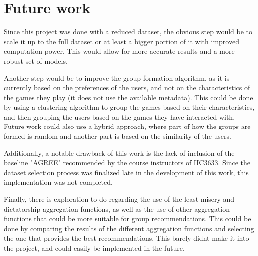\documentclass{article}
\begin{document}





\section{Future work}

Since this project was done with a reduced dataset, the obvious step would be to scale it up to the full dataset or at least a bigger portion of it with improved computation power. This would allow for more accurate results and a more robust set of models.

Another step would be to improve the group formation algorithm, as it is currently based on the preferences of the users, and not on the characteristics of the games they play (it does not use the available metadata). This could be done by using a clustering algorithm to group the games based on their characteristics, and then grouping the users based on the games they have interacted with. Future work could also use a hybrid approach, where part of how the groups are formed is random and another part is based on the similarity of the users.

Additionally, a notable drawback of this work is the lack of inclusion of the baseline "AGREE" recommended by the course instructors of IIC3633. Since the dataset selection process was finalized late in the development of this work, this implementation was not completed.

Finally, there is exploration to do regarding the use of the least misery and dictatorship aggregation functions, as well as the use of other aggregation functions that could be more suitable for group recommendations. This could be done by comparing the results of the different aggregation functions and selecting the one that provides the best recommendations. This barely didnt make it into the project, and could easily be implemented in the future.



\end{document}
